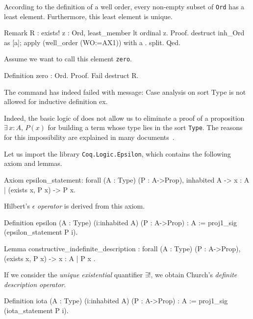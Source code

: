 According to the  definition of a well order, every non-empty subset of \texttt{Ord} has a least element. Furthermore, this least element is unique.


\begin{Coqsrc}
Remark R : exists! z : Ord, least_member lt  ordinal z.
Proof.
  destruct inh_Ord as [a]; apply (well_order (WO:=AX1)) with a .
  split.
Qed.
\end{Coqsrc}

Assume we want to call this element  \texttt{zero}.



\begin{Coqsrc}
Definition zero : Ord.
Proof.
  Fail destruct R.
\end{Coqsrc}

\begin{Coqanswer}
The command has indeed failed with message:
Case analysis on sort Type is not allowed for inductive 
definition ex.
\end{Coqanswer}


Indeed, the basic logic of  \coq{} does not allow us to eliminate a proof of a proposition 
$\exists\,x:A,\,P(x)$ for building a term whose type lies in the sort \texttt{Type}. 
The reasons for this impossibility are explained in many documents~\cite{BC04, chlipalacpdt2011, Coq}.

Let us import the library \texttt{Coq.Logic.Epsilon}, which contains the following axiom and lemmas.


\begin{Coqsrc}
Axiom epsilon_statement:
  forall (A : Type) (P : A->Prop), inhabited A ->
    {x : A | (exists x, P x) -> P x}.
\end{Coqsrc}

Hilbert's $\epsilon$ \emph{operator} is derived from this  axiom.

\begin{Coqsrc}
Definition epsilon (A : Type) (i:inhabited A) (P : A->Prop) : A
  := proj1_sig (epsilon_statement P i).

Lemma constructive_indefinite_description :
  forall (A : Type) (P : A->Prop),
    (exists x, P x) -> { x : A | P x }.
\end{Coqsrc}




If we consider the \emph{unique existential} quantifier $\exists!$, we obtain
Church's \emph{definite description operator}.

\begin{Coqsrc}
Definition iota (A : Type) (i:inhabited A) (P : A->Prop) : A
  := proj1_sig (iota_statement P i).
\end{Coqsrc}


